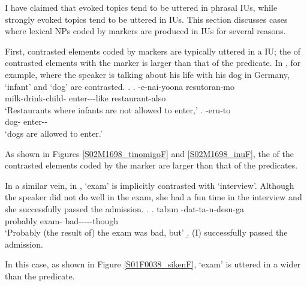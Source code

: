 I have claimed that
evoked topics tend to be uttered in phrasal IUs,
while strongly evoked topics tend to be uttered in  IUs.
This section discusses cases where
lexical NPs coded by  markers are produced in  IUs
for several reasons.

First, contrasted elements coded by  markers are typically uttered in a  IU;
the  of contrasted elements with the  marker  is larger than
that of the predicate.
In \Next, for example,
where the speaker is talking about his life with his dog in Germany,
 `infant' and  `dog' are contrasted.
%
\ex.\label{S02M1698_tinomigo}
 \ag.  -e-nai-yoona resutoran-mo \tp{\dvline} \\
 		milk-drink-child- enter---like restaurant-also {} \\
		`Restaurants where infants are not allowed to enter,'
 \bg.  -eru-to \tp{\dvline} \\
 		dog- enter-- {}\\
 		`dogs are allowed to enter.'

As shown in Figures \ref{S02M1698_tinomigoF} and \ref{S02M1698_inuF},
the  of the contrasted elements coded by the  marker  are larger than that of the predicates.

In a similar vein,
in \Next,
 `exam' is implicitly contrasted with  `interview'.
Although the speaker did not do well in the exam,
she had a fun time in the interview and she successfully passed the admission.
\ex.\label{S01F0038_siken}
 \ag. tabun  -dat-ta-n-desu-ga \tp{\dvline} \\
 	probably exam- bad-----though {} \\
	`Probably (the result of) the exam was bad, but'
 \b. (I) successfully passed the admission.

In this case,
as shown in Figure \ref{S01F0038_sikenF},
 `exam' is uttered in a wider  than the predicate.

